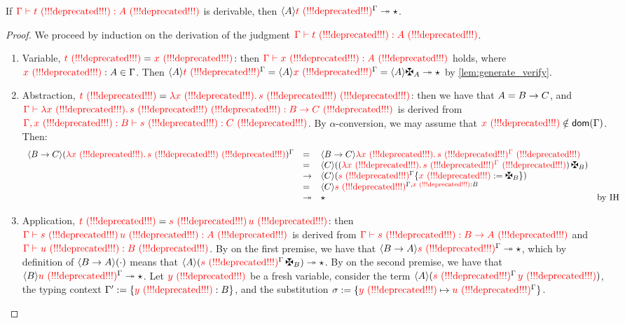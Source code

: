 \begin{theorem}[Soundness]
If $\judg{\tenv}{\tm}{\typ}$ is derivable,
then $\verif{\typ}{\subs{\tm}{\tenv}} \tos \iunit$.
\end{theorem}
\begin{proof}
We proceed by induction on the derivation of the judgment $\judg{\tenv}{\tm}{\typ}$.
\begin{enumerate}
\item
  Variable, $\tm = \var$:
  then $\judg{\tenv}{\var}{\typ}$ holds, where $\var:\typ\in\tenv$.
  Then
  $\verif{\typ}{\subs{\tm}{\tenv}}
  = \verif{\typ}{\subs{\var}{\tenv}}
  = \verif{\typ}{\gen{\typ}}
  \tos \iunit$
  by \cref{lem:generate_verify}.
\item
  Abstraction, $\tm = \lam{\var}{\tmtwo}$:
  then we have that $\typ = \typtwo\to\typthree$,
  and $\judg{\tenv}{\lam{\var}{\tmtwo}}{\typtwo\to\typthree}$
  is derived from $\judg{\tenv,\var:\typtwo}{\tmtwo}{\typthree}$.
  By $\alpha$-conversion, we may assume that $\var \notin \dom{\tenv}$.
  Then:
  \[
    \begin{array}{rlll}
      \verif{\typtwo\to\typthree}{\subs{(\lam{\var}{\tmtwo})}{\tenv}}
    & = &
      \verif{\typtwo\to\typthree}{\lam{\var}{\subs{\tmtwo}{\tenv}}}
    \\
    & = &
      \verif{\typthree}{((\lam{\var}{\subs{\tmtwo}{\tenv}})\,\gen{\typtwo})}
    \\
    & \to &
      \verif{\typthree}{(\subs{\tmtwo}{\tenv}\sub{\var}{\gen{\typtwo}})}
    \\
    & = &
      \verif{\typthree}{\subs{\tmtwo}{\tenv,\var:\typtwo}}
    \\
    & \tos &
      \iunit
      & \text{by \ih}
    \end{array}
  \]
\item
  Application, $\tm = \tmtwo\,\tmthree$:
  then $\judg{\tenv}{\tmtwo\,\tmthree}{\typ}$
  is derived from $\judg{\tenv}{\tmtwo}{\typtwo\to\typ}$
  and $\judg{\tenv}{\tmthree}{\typtwo}$.
  By \ih on the first premise, we have that
  $\verif{\typtwo\to\typ}{\subs{\tmtwo}{\tenv}} \tos \iunit$,
  which by definition of $\verif{\typtwo\to\typ}{\ARG}$
  means that
  $\verif{\typ}{(\subs{\tmtwo}{\tenv}\,\gen{\typtwo})} \tos \iunit$.
  By \ih on the second premise, we have that
  $\verif{\typtwo}{\subs{\tmthree}{\tenv}} \tos \iunit$.
  Let $\vartwo$ be a fresh variable,
  consider the term
  $\verif{\typ}{(\subs{\tmtwo}{\tenv}\,\vartwo)}$,
  the typing context $\tenvtwo := \set{\vartwo:\typtwo}$,
  and the substitution $\subst := \set{\vartwo \mapsto \subs{\tmthree}{\tenv}}$.

\end{enumerate}
\end{proof}
